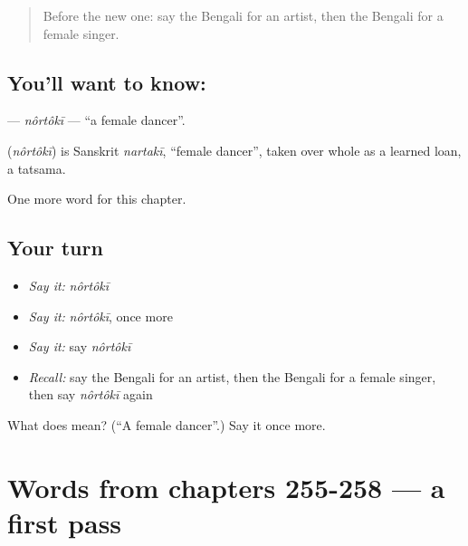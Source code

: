 \label{lesson:BN-C262-nortoki}



\begin{quote}
Before the new one: say the Bengali for an artist, then the Bengali for a female singer.
\end{quote}

\subsection*{You'll want to know: }
\textbf{} — \emph{nôrtôkī} — \textquotedblleft{}a female dancer\textquotedblright{}.

\begin{cousinweb}
\textbf{} (\emph{nôrtôkī}) is Sanskrit \emph{nartakī}, \textquotedblleft{}female dancer\textquotedblright{}, taken over whole as a learned loan, a tatsama.
\end{cousinweb}

\begin{grammarlens}[title={What you've built}]
One more word for this chapter.
\end{grammarlens}

\subsection*{Your turn}
\begin{itemize}
\raggedright
  \item \emph{Say it:} \emph{nôrtôkī}
  \item \emph{Say it:} \emph{nôrtôkī}, once more
  \item \emph{Say it:} say \emph{nôrtôkī}
  \item \emph{Recall:} say the Bengali for an artist, then the Bengali for a female singer, then say \emph{nôrtôkī} again
\end{itemize}

\begin{tcolorbox}[breakable,colback=teal!4,colframe=teal!35!black,title={Before you move on}]
What does  mean? (\textquotedblleft{}A female dancer\textquotedblright{}.) Say it once more.
\end{tcolorbox}
\section[(dialogue)]{Words from chapters 255-258 — a first pass}

\label{lesson:BN-R262-first-pass-words-from-chapters-255-258}



